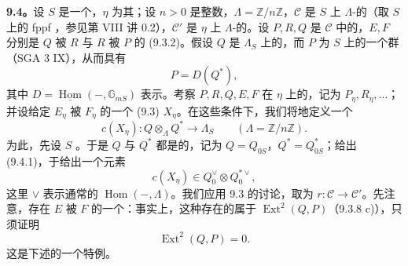 \textbf{9.4。}设 $S$ 是一个，$\eta$ 为其；设 $n>0$ 是整数，$\Lambda=\mathbb Z/n\mathbb Z$，$\mathcal C$ 是 $S$ 上 $\Lambda$-的（取 $S$ 上的 fppf ，参见第 VIII 讲 0.2），$\mathcal C'$ 是 $\eta$ 上 $\Lambda$-的。设 $P,R,Q$ 是 $\mathcal C$ 中的，$E,F$ 分别是 $Q$ 被 $R$ 与 $R$ 被 $P$ 的 (9.3.2)。假设 $Q$ 是 $\Lambda_S$ 上的，而 $P$ 为 $S$ 上的一个群（SGA 3 IX），从而具有
\[
 P=D(Q^*),
\]
其中 $D=\underline{\operatorname{Hom}}(-,\mathbb G_{mS})$ 表示。考察 $P,R,Q,E,F$ 在 $\eta$ 上的，记为 $P_\eta,R_\eta,\ldots$；并设给定 $E_\eta$ 被 $F_\eta$ 的一个 (9.3) $X_\eta$。在这些条件下，我们将地定义一个
\begin{equation}\tag{9.4.1}
 c(X_\eta):Q\otimes_\Lambda Q^*\longrightarrow\Lambda_S
 \qquad(\Lambda=\mathbb Z/n\mathbb Z).
\end{equation}
为此，先设 $S$ 。于是 $Q$ 与 $Q^*$ 都是的，记为 $Q=Q_{0S}$，$Q^*=Q^*_{0S}$；给出 (9.4.1)，于给出一个元素
\begin{equation}\tag{9.4.2}
 c(X_\eta)\in Q_0^\vee\otimes Q_0^{*\vee},
\end{equation}
这里 $\vee$ 表示通常的 $\operatorname{Hom}(-,\Lambda)$。我们应用 9.3 的讨论，取为 $r:\mathcal C\to\mathcal C'$。先注意，存在 $E$ 被 $F$ 的一个：事实上，这种存在的属于 $\operatorname{Ext}^2(Q,P)$（9.3.8 c)），只须证明
\[
 \operatorname{Ext}^2(Q,P)=0.
\]
这是下述的一个特例。

